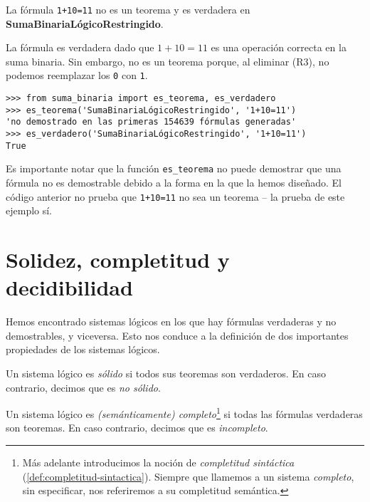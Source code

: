 \begin{ejemplo}\label{ej:suma-binaria-logico-restringido-incompleto}
La fórmula \texttt{1+10=11} no es un teorema y es verdadera en \textbf{SumaBinariaLógicoRestringido}.

La fórmula es verdadera dado que $1+10=11$ es una operación correcta en la suma binaria. Sin embargo, no es un teorema porque, al eliminar (R3), no podemos reemplazar los \texttt{0} con \texttt{1}.
\begin{lstlisting}[numbers=none,frame=none]
>>> from suma_binaria import es_teorema, es_verdadero
>>> es_teorema('SumaBinariaLógicoRestringido', '1+10=11')
'no demostrado en las primeras 154639 fórmulas generadas'
>>> es_verdadero('SumaBinariaLógicoRestringido', '1+10=11')
True
\end{lstlisting}
Es importante notar que la función \texttt{es\_teorema} no puede demostrar que una fórmula no es demostrable debido a la forma en la que la hemos diseñado. El código anterior no prueba que \texttt{1+10=11} no sea un teorema -- la prueba de este ejemplo sí.
\end{ejemplo}

\section{Solidez, completitud y decidibilidad}\label{sec:solidez-completitud-decidibilidad}

Hemos encontrado sistemas lógicos en los que hay fórmulas verdaderas y no demostrables, y viceversa. Esto nos conduce a la definición de dos importantes propiedades de los sistemas lógicos.

\begin{definicion}[Solidez]\label{def:solidez}
Un sistema lógico es \emph{sólido} si todos sus teoremas son verdaderos. En caso contrario, decimos que es \emph{no sólido}.
\end{definicion}

\begin{definicion}[Completitud]\label{def:completitud}
Un sistema lógico es \emph{(semánticamente) completo}\footnote{Más adelante introducimos la noción de \emph{completitud sintáctica} (\cref{def:completitud-sintactica}). Siempre que llamemos a un sistema \emph{completo}, sin especificar, nos referiremos a su completitud semántica.} si todas las fórmulas verdaderas son teoremas. En caso contrario, decimos que es \emph{incompleto}.
\end{definicion}


